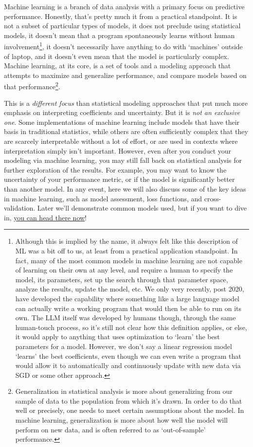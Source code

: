 \documentclass[
  letterpaper,
]{krantz}
\begin{document}
Machine learning is a branch of data analysis with a primary focus on
predictive performance. Honestly, that's pretty much it from a practical
standpoint. It is not a subset of particular types of models, it does
not preclude using statistical models, it doesn't mean that a program
spontaneously learns without human involvement\footnote{Although this is
  implied by the name, it always felt like this description of ML was a
  bit off to us, at least from a practical application standpoint. In
  fact, many of the most common models in machine learning are not
  capable of learning on their own at any level, and require a human to
  specify the model, its parameters, set up the search through that
  parameter space, analyze the results, update the model, etc. We only
  very recently, post 2020, have developed the capability where
  something like a large language model can actually write a working
  program that would then be able to run on its own. The LLM itself was
  developed by humans though, through the same human-touch process, so
  it's still not clear how this definition applies, or else, it would
  apply to anything that uses optimization to `learn' the best
  parameters for a model. However, we don't say a linear regression
  model `learns' the best coefficients, even though we can even write a
  program that would allow it to automatically and continuously update
  with new data via SGD or some other approach.}, it doesn't necessarily
have anything to do with `machines' outside of laptop, and it doesn't
even mean that the model is particularly complex. Machine learning, at
its core, is a set of tools and a modeling approach that attempts to
maximize and generalize performance, and compare models based on that
performance\footnote{Generalization in statistical analysis is more
  about generalizing from our sample of data to the population from
  which it's drawn. In order to do that well or precisely, one needs to
  meet certain assumptions about the model. In machine learning,
  generalization is more about how well the model will perform on new
  data, and is often referred to as `out-of-sample' performance.}.

This is a \emph{different focus} than statistical modeling approaches
that put much more emphasis on interpreting coefficients and
uncertainty. But it is \emph{not an exclusive one}. Some implementations
of machine learning include models that have their basis in traditional
statistics, while others are often sufficiently complex that they are
scarcely interpretable without a lot of effort, or are used in contexts
where interpretation simply isn't important. However, even after you
conduct your modeling via machine learning, you may still fall back on
statistical analysis for further exploration of the results. For
example, you may want to know the uncertainty of your performance
metric, or if the model is significantly better than another model. In
any event, here we will also discuss some of the key ideas in machine
learning, such as model assessment, loss functions, and
cross-validation. Later we'll demonstrate common models used, but if you
want to dive in, \hyperref[common-models]{you can head there now}!
\end{document}
